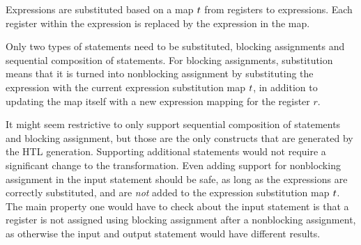 \begin{definition}%
  \label{def:substitute-expressions}

  Expressions are substituted based on a map $t$ from registers to
  expressions.  Each register within the expression is replaced by the
  expression in the map.

\end{definition}

\begin{definition}%
  \label{def:substitute-statements}

  Only two types of statements need to be substituted, blocking assignments and
  sequential composition of statements.  For blocking assignments, substitution
  means that it is turned into nonblocking assignment by substituting the
  expression with the current expression substitution map $t$, in
  addition to updating the map itself with a new expression mapping for the
  register $r$.

\end{definition}

It might seem restrictive to only support sequential composition of statements
and blocking assignment, but those are the only constructs that are generated by
the HTL generation.  Supporting additional statements would not require a
significant change to the transformation.  Even adding support for nonblocking
assignment in the input statement should be safe, as long as the expressions are
correctly substituted, and are \emph{not} added to the expression substitution
map $t$.  The main property one would have to check about the input
statement is that a register is not assigned using blocking assignment after a
nonblocking assignment, as otherwise the input and output statement would have
different results.

